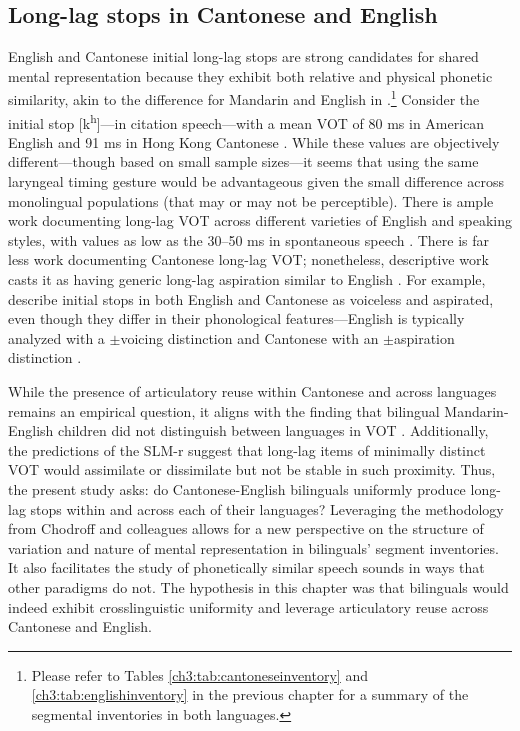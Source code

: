 \subsection{Long-lag stops in Cantonese and English}\label{ch4:sec:rqs}

English and Cantonese initial long-lag stops are strong candidates for shared mental representation because they exhibit both relative and physical phonetic similarity, akin to the difference for Mandarin and English in \citet{yang_2019_vot}.\footnote{Please refer to Tables \ref{ch3:tab:cantoneseinventory} and \ref{ch3:tab:englishinventory} in the previous chapter for a summary of the segmental inventories in both languages.} Consider the initial stop [k\textsuperscript{h}]---in citation speech---with a mean VOT of 80 ms in American English \citep{lisker_1964_vot} and 91 ms in Hong Kong Cantonese \citep{clumeck_1981_cantonese}. While these values are objectively different---though based on small sample sizes---it seems that using the same laryngeal timing gesture would be advantageous given the small difference across monolingual populations (that may or may not be perceptible). There is ample work documenting long-lag VOT across different varieties of English and speaking styles, with values as low as the 30--50 ms in spontaneous speech \citep{stuartsmith_2015_private}. There is far less work documenting Cantonese long-lag VOT; nonetheless, descriptive work casts it as having generic long-lag aspiration similar to English \citep{matthews_2013_cantonese, bauer_1997_cantonese, chan_2000_english, mielke_2018_voice}. For example, \citet{matthews_2013_cantonese} describe initial stops in both English and Cantonese as voiceless and aspirated, even though they differ in their phonological features---English is typically analyzed with a $\pm$voicing distinction and Cantonese with an $\pm$aspiration distinction \citep{matthews_2013_cantonese}.
 
While the presence of articulatory reuse within Cantonese and across languages remains an empirical question, it aligns with the finding that bilingual Mandarin-English children did not distinguish between languages in VOT \citep{yang_2019_vot}. Additionally, the predictions of the SLM-r \citep{flege_2021_slmr} suggest that long-lag items of minimally distinct VOT would assimilate or dissimilate but not be stable in such proximity. Thus, the present study asks: do Cantonese-English bilinguals uniformly produce long-lag stops within and across each of their languages? Leveraging the methodology from Chodroff and colleagues \citep{chodroff_2017_structure, chodroff_2018_predictability, chodroff_2019_l2} allows for a new perspective on the structure of variation and nature of mental representation in bilinguals' segment inventories. It also facilitates the study of phonetically similar speech sounds in ways that other paradigms do not. The hypothesis in this chapter was that bilinguals would indeed exhibit crosslinguistic uniformity and leverage articulatory reuse across Cantonese and English. 

